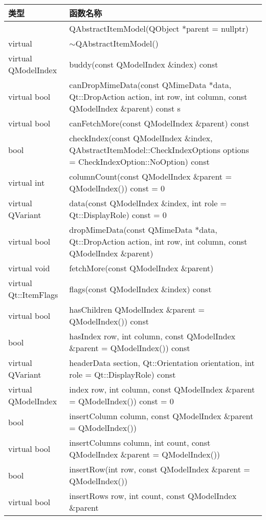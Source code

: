 \begin{longtable}{|m{10em}|m{30em}|}
\hline
类型 & 函数名称 \\
\hline
& QAbstractItemModel(QObject *parent = nullptr)\\
\hline
virtual	& $\sim$QAbstractItemModel()\\
\hline
virtual QModelIndex	& buddy(const QModelIndex \&index) const\\
\hline
virtual bool & canDropMimeData(const QMimeData *data, Qt::DropAction
               action, int row, int column, const QModelIndex
               \&parent) const s\\
\hline
virtual bool &canFetchMore(const QModelIndex \&parent) const\\
\hline
bool & checkIndex(const QModelIndex \&index,
       QAbstractItemModel::CheckIndexOptions options =
       CheckIndexOption::NoOption) const\\
\hline
virtual int&columnCount(const QModelIndex \&parent = QModelIndex())
             const = 0\\
\hline
virtual QVariant&	data(const QModelIndex \&index, int role = Qt::DisplayRole) const = 0\\
\hline
virtual bool&	dropMimeData(const QMimeData *data, Qt::DropAction
              action, int row, int column, const QModelIndex \&parent)\\
\hline
virtual void&	fetchMore(const QModelIndex \&parent)\\
\hline
virtual Qt::ItemFlags&	flags(const QModelIndex \&index) const\\
\hline
virtual bool&	hasChildren QModelIndex \&parent = QModelIndex()) const\\
\hline
bool	&hasIndex row, int column, const QModelIndex \&parent = QModelIndex()) const\\
\hline
virtual QVariant	&headerData section, Qt::Orientation orientation, int role = Qt::DisplayRole) const\\
\hline
virtual QModelIndex& index row, int column, const QModelIndex \&parent = QModelIndex()) const = 0\\
\hline
bool	&insertColumn column, const QModelIndex \&parent = QModelIndex())\\
\hline
virtual bool & insertColumns column, int count, const QModelIndex \&parent = QModelIndex())\\
\hline
bool&	insertRow(int row, const QModelIndex \&parent = QModelIndex())\\
\hline
virtual bool&	insertRows row, int count, const QModelIndex \&parent

\end{longtable}
